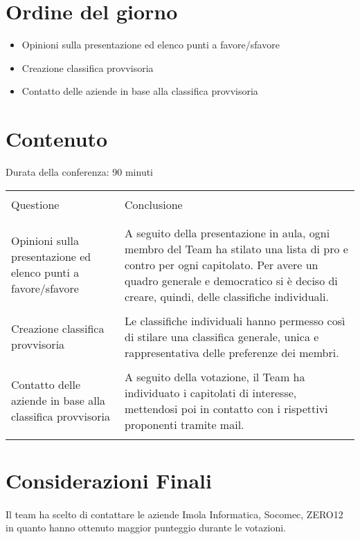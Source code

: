 \section{Ordine del giorno}
\begin{itemize}
    \item Opinioni sulla presentazione ed elenco punti a favore/sfavore
    \item Creazione classifica provvisoria
    \item Contatto delle aziende in base alla classifica provvisoria 
\end{itemize}
\section{Contenuto}
Durata della conferenza: 90 minuti
\newline
\begin{longtable}{|p{7cm}|p{8cm}|}
    \hline
    & \\
    Questione & Conclusione\\
    & \\
    \hline
    & \\

    Opinioni sulla presentazione ed elenco punti a favore/sfavore
    &
    A seguito della presentazione in aula, ogni membro del Team ha
    stilato una lista di pro e contro per ogni capitolato. Per avere
    un quadro generale e democratico si è deciso di creare, quindi,
    delle classifiche individuali.\\

    & \\

    Creazione classifica provvisoria
    &
    Le classifiche individuali hanno permesso così di stilare una
    classifica generale, unica e rappresentativa delle preferenze dei membri.\\

    & \\

    Contatto delle aziende in base alla classifica provvisoria
    &
    A seguito della votazione, il Team ha individuato i capitolati di interesse,
    mettendosi poi in contatto con i rispettivi proponenti tramite mail.\\

    & \\
    
    \hline
\end{longtable}

\section{Considerazioni Finali}

\paragraph{}
Il team ha scelto di contattare le aziende \textregistered Imola Informatica,
\textregistered Socomec, \textregistered ZERO12
in quanto hanno ottenuto maggior punteggio durante le votazioni.